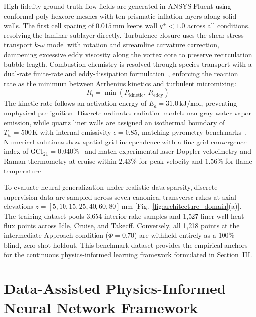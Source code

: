 \documentclass[reprint,aps,prfluids,superscriptaddress,twocolumn,floatfix]{revtex4-2}
\begin{document}
High-fidelity ground-truth flow fields are generated in ANSYS Fluent using conformal poly-hexcore meshes with ten prismatic inflation layers along solid walls. The first cell spacing of $0.015\,\text{mm}$ keeps wall $y^+ < 1.0$ across all conditions, resolving the laminar sublayer directly. Turbulence closure uses the shear-stress transport $k$-$\omega$ model with rotation and streamline curvature correction, dampening excessive eddy viscosity along the vortex core to preserve recirculation bubble length. Combustion chemistry is resolved through species transport with a dual-rate finite-rate and eddy-dissipation formulation~\cite{oconaire2004comprehensive}, enforcing the reaction rate as the minimum between Arrhenius kinetics and turbulent micromixing:
\begin{equation}
    R_i = \min\left(R_{\text{kinetic}},\, R_{\text{eddy}}\right)
    \label{eq:dual_rate_reaction}
\end{equation}
The kinetic rate follows an activation energy of $E_a = 31.0\,\text{kJ/mol}$, preventing unphysical pre-ignition. Discrete ordinates radiation models non-gray water vapor emission, while quartz liner walls are assigned an isothermal boundary of $T_w = 500\,\text{K}$ with internal emissivity $\epsilon = 0.85$, matching pyrometry benchmarks~\cite{kamble2026aerothermo}. Numerical solutions show spatial grid independence with a fine-grid convergence index of $\text{GCI}_{21} = 0.040\%$~\cite{asme2009standard} and match experimental laser Doppler velocimetry and Raman thermometry at cruise within $2.43\%$ for peak velocity and $1.56\%$ for flame temperature~\cite{govert2024experimental}.

To evaluate neural generalization under realistic data sparsity, discrete supervision data are sampled across seven canonical transverse rakes at axial elevations $z = [5, 10, 15, 25, 40, 60, 80]\,\text{mm}$ [Fig.~\ref{fig:architecture_domain}(a)]. The training dataset pools 3,654 interior rake samples and 1,527 liner wall heat flux points across Idle, Cruise, and Takeoff. Conversely, all 1,218 points at the intermediate Approach condition ($\Phi = 0.70$) are withheld entirely as a 100\% blind, zero-shot holdout. This benchmark dataset provides the empirical anchors for the continuous physics-informed learning framework formulated in Section~III.

\section{Data-Assisted Physics-Informed Neural Network Framework}
\label{sec:pinn_framework}
\end{document}
